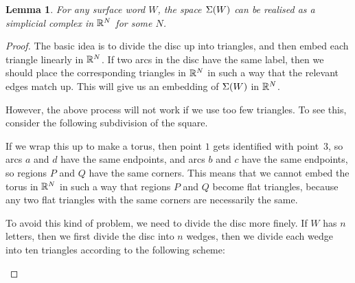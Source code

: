\documentclass[reqno]{amsart}
\newtheorem{lemma}[theorem]{Lemma}
\theoremstyle{definition}
\begin{document}
\begin{lemma}\label{lem-Sg-embeds}
 For any surface word $W$, the space $\Sigma(W)$ can be realised as a
 simplicial complex in $\mathbb{R}^N$ for some $N$.  
\end{lemma}
\begin{proof}
 The basic idea is to divide the disc up into triangles, and then
 embed each triangle linearly in $\mathbb{R}^N$.  If two arcs in the disc have
 the same label, then we should place the corresponding triangles in
 $\mathbb{R}^N$ in such a way that the relevant edges match up.  This will
 give us an embedding of $\Sigma(W)$ in $\mathbb{R}^N$.

 However, the above process will not work if we use too few
 triangles.  To see this, consider the following subdivision of the
 square.  
 \begin{center}
 \end{center}
 If we wrap this up to make a torus, then point $1$ gets identified
 with point~$3$, so arcs $a$ and $d$ have the same endpoints, and arcs
 $b$ and $c$ have the same endpoints, so regions $P$ and $Q$ have the
 same corners.  This means that we cannot embed the torus in $\mathbb{R}^N$ in
 such a way that regions $P$ and $Q$ become flat triangles, because
 any two flat triangles with the same corners are necessarily the
 same.  

 To avoid this kind of problem, we need to divide the disc more
 finely.  If $W$ has $n$ letters, then we first divide the disc into
 $n$ wedges, then we divide each wedge into ten triangles according to
 the following scheme:
 \begin{center}
 \end{center}


\end{proof}
\end{document}
